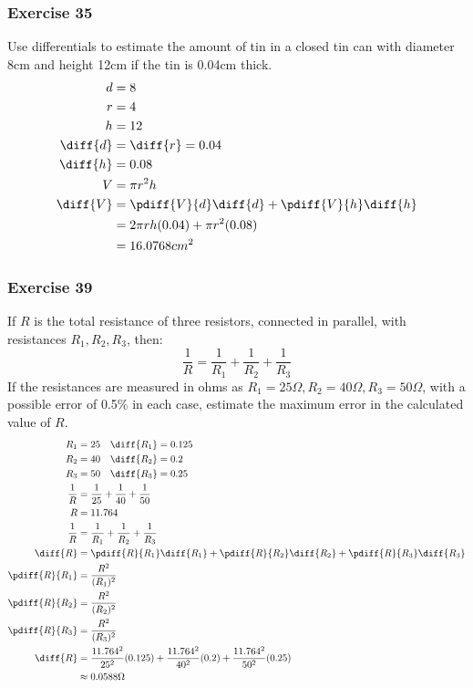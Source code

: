 \documentclass[letterpaper, 12pt]{math}
\begin{document}
\subsubsection*{Exercise 35}
Use differentials to estimate the amount of tin in a closed tin can with
diameter 8cm and height 12cm if the tin is 0.04cm thick.
\begin{align*}
  d &= 8 \\
  r &= 4 \\
  h &= 12 \\
  \diff{d} &= \diff{r} = 0.04 \\
  \diff{h} &= 0.08 \\
  V &= \pi r^2h \\
  \diff{V} &= \pdiff{V}{d}\diff{d}+\pdiff{V}{h}\diff{h} \\
  &= 2\pi rh(0.04)+\pi r^2(0.08) \\
  &= 16.0768cm^2
\end{align*}

\subsubsection*{Exercise 39}
If \( R \) is the total resistance of three resistors, connected in parallel,
with resistances \( R_1,R_2,R_3 \), then:
\[ \frac{1}{R} = \frac{1}{R_1}+\frac{1}{R_2}+\frac{1}{R_3} \]
If the resistances are measured in ohms as \( R_1 = 25\Omega, R_2 = 40\Omega,
R_3 = 50\Omega \), with a possible error of 0.5\% in each case, estimate the
maximum error in the calculated value of \( R \).
\begin{align*}
  R_1 &= 25 \quad \diff{R_1} = 0.125 \\
  R_2 &= 40 \quad \diff{R_2} = 0.2 \\
  R_3 &= 50 \quad \diff{R_3} = 0.25 \\
  \frac{1}{R} &= \frac{1}{25}+\frac{1}{40}+\frac{1}{50} \\
  R &= 11.764 \\
  \frac{1}{R} &= \frac{1}{R_1}+\frac{1}{R_2}+\frac{1}{R_3} \\
  \diff{R} &= \pdiff{R}{R_1}\diff{R_1}+\pdiff{R}{R_2}\diff{R_2}+
    \pdiff{R}{R_3}\diff{R_3} \\
  \pdiff{R}{R_1} &= \frac{R^2}{(R_1)^2} \\
  \pdiff{R}{R_2} &= \frac{R^2}{(R_2)^2} \\
  \pdiff{R}{R_3} &= \frac{R^2}{(R_3)^2} \\
  \diff{R} &= \frac{11.764^2}{25^2}(0.125)+\frac{11.764^2}{40^2}(0.2)+
    \frac{11.764^2}{50^2}(0.25) \\
  &\approx 0.0588\Omega
\end{align*}
\end{document}
